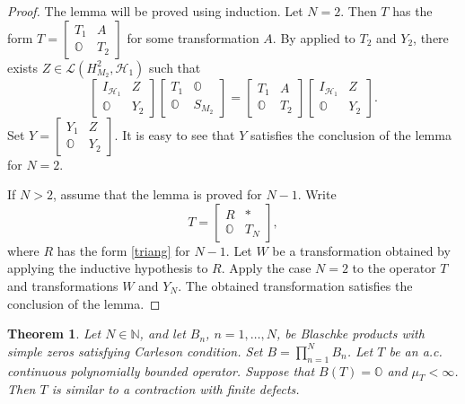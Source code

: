 \documentclass[a4paper,oneside,11pt]{amsart}
\numberwithin{equation}{section}
\theoremstyle{plain}
\newtheorem{theorem}{Theorem}[section]
\theoremstyle{definition}
\begin{document}
\begin{proof} The lemma will be proved using induction. Let $N=2$. Then $T$  has the form 
$T= \left[ \begin{matrix} T_1  & A \\ \mathbb O & T_2 \end{matrix}\right]$ for some transformation $A$.
  By   {\cite[Lemma 1]{takshift}} applied to $T_2$ and $Y_2$, 
there exists $Z\in\mathcal L(H^2_{M_2},\mathcal H_1)$ such that 
 \begin{equation*}  
\left[ \begin{matrix} I_{\mathcal H_1}  & Z \\ \mathbb O & Y_2 \end{matrix}\right] 
\left[ \begin{matrix} T_1  & \mathbb O \\ \mathbb O & S_{M_2} \end{matrix}\right] 
= \left[ \begin{matrix} T_1  & A \\ \mathbb O & T_2 \end{matrix}\right]
\left[ \begin{matrix} I_{\mathcal H_1}   & Z \\ \mathbb O & Y_2 \end{matrix}\right]. 
\end{equation*} 
Set $Y=\left[ \begin{matrix} Y_1  & Z \\ \mathbb O & Y_2 \end{matrix}\right]$. It is easy to see that $Y$ 
satisfies the conclusion of the lemma for $N=2$. 

If $N>2$, assume that the lemma is proved for $N-1$. Write  
\begin{equation*} T= \left[ \begin{matrix} R  & * \\ \mathbb O & T_N
 \end{matrix}\right], 
\end{equation*} 
where $R$ has the form \eqref{triang} for $N-1$. Let $W$ be a transformation obtained 
by applying the inductive hypothesis to $R$. 
Apply the case $N=2$ to the operator $T$ and transformations $W$ and $Y_N$. 
The obtained transformation satisfies the conclusion of the lemma. 
 \end{proof}



\begin{theorem}\label{thmblaschke} Let $N\in\mathbb N$, and let $B_n$, $n=1,\ldots, N$, be  Blaschke products with simple zeros satisfying 
Carleson condition. Set $B=\prod_{n=1}^N B_n$. Let $T$ be an a.c. continuous polynomially bounded operator.
Suppose that $B(T)=\mathbb O$ and $\mu_T<\infty$. Then $T$ is similar to a contraction with finite defects. 
\end{theorem}
\end{document}
